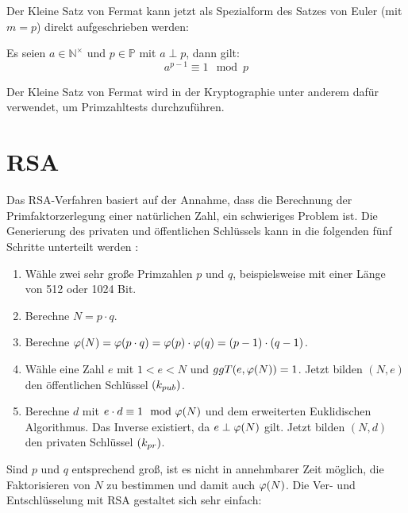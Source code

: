 \noindent
Der Kleine Satz von Fermat kann jetzt als Spezialform des Satzes von Euler (mit $m = p$) direkt
aufgeschrieben werden:

\begin{satz}
  Es seien $a \in \mathbb{N}^\times$ und $p \in \mathbb{P}$ mit $a \perp p$, dann gilt:
  \begin{equation*}
    a^{p-1} \equiv 1 \mod{p}
  \end{equation*}
\end{satz}

\noindent
Der Kleine Satz von Fermat wird in der Kryptographie unter anderem dafür verwendet,
um Primzahltests durchzuführen.

\section{RSA}
Das RSA-Verfahren basiert auf der Annahme, dass die Berechnung der Primfaktorzerlegung
einer natürlichen Zahl, ein schwieriges Problem ist.
Die Generierung des privaten und öffentlichen Schlüssels kann in die
folgenden fünf Schritte unterteilt werden \parencite[176]{BOOK:crypto}:

\begin{definition}\mbox{}
  \begin{enumerate}
    \item Wähle zwei sehr große Primzahlen $p$ und $q$, beispielsweise mit einer Länge
          von 512 oder 1024 Bit.
    \item Berechne $N = p \cdot q$.
    \item Berechne $\varphi(N) = \varphi(p \cdot q) = \varphi(p) \cdot \varphi(q) = (p-1) \cdot (q-1)$.
    \item Wähle eine Zahl $e$ mit $1 < e < N$ und $ggT(e,\varphi(N)) = 1$. Jetzt bilden
          $(N,e)$ den öffentlichen Schlüssel $(k_{pub})$.
    \item Berechne $d$ mit $e \cdot d \equiv 1 \mod{\varphi(N)}$ und dem erweiterten
          Euklidischen Algorithmus. Das Inverse existiert, da $e \perp \varphi(N)$ gilt. Jetzt bilden
          $(N,d)$ den privaten Schlüssel $(k_{pr})$.
  \end{enumerate}
\end{definition}

\noindent
Sind $p$ und $q$ entsprechend groß, ist es nicht in annehmbarer Zeit möglich, die Faktorisieren
von $N$ zu bestimmen und damit auch $\varphi(N)$. Die Ver- und Entschlüsselung mit RSA
gestaltet sich sehr einfach:

